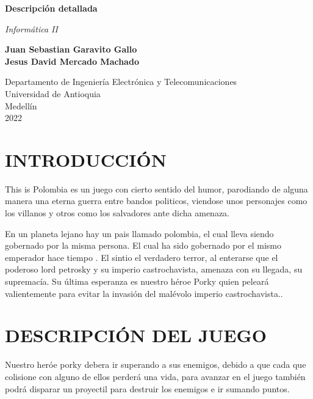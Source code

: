 \documentclass{article}
\begin{document}
\begin{titlepage}
    \begin{center}
        \vspace*{1cm}
        
        \Huge
        \textbf{Descripción detallada}
            
        \vspace{0.5cm}
        \LARGE
       \textit{ Informática II}
            
        \vspace{1.5cm}
            
        \textbf{Juan Sebastian Garavito Gallo\\
        Jesus David Mercado Machado}
            
        \vfill
            
        \vspace{0.8cm}
            
        \Large
        Departamento de Ingeniería Electrónica y Telecomunicaciones\\
        Universidad de Antioquia\\
        Medellín\\
        2022
            
    \end{center}
\end{titlepage}

\tableofcontents


\newpage
\section{INTRODUCCIÓN}
This is Polombia es un juego con cierto sentido del humor, parodiando de alguna manera una eterna guerra entre bandos politicos, viendose unos personajes como los villanos y otros como los salvadores ante dicha amenaza.

En un planeta lejano hay un pais llamado polombia, el cual lleva siendo gobernado por la misma persona. El cual ha sido gobernado por el mismo emperador hace tiempo . El  sintio el verdadero terror, al enterarse que el poderoso lord  petrosky y su imperio castrochavista, amenaza con su llegada, su supremacía. Su última esperanza es nuestro héroe Porky quien peleará valientemente para evitar la invasión del malévolo imperio castrochavista..

\section{DESCRIPCIÓN DEL JUEGO}
Nuestro heróe porky debera ir superando a sus enemigos, debido a que cada que colisione con alguno de ellos perderá una vida, para avanzar en el juego también podrá disparar un proyectil para destruir los enemigos e ir sumando puntos.
\end{document}
